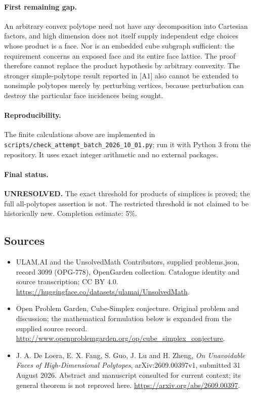 \documentclass[11pt,a4paper]{article}
\begin{document}
\paragraph{First remaining gap.}
An arbitrary convex polytope need not have any decomposition into Cartesian
factors, and high dimension does not itself supply independent edge choices
whose product is a face. Nor is an embedded cube subgraph sufficient: the
requirement concerns an exposed face and its entire face lattice. The proof
therefore cannot replace the product hypothesis by arbitrary convexity.
The stronger simple-polytope result reported in [A1] also cannot be extended
to nonsimple polytopes merely by perturbing vertices, because perturbation
can destroy the particular face incidences being sought.

\paragraph{Reproducibility.}
The finite calculations above are implemented in
\texttt{scripts/check\_attempt\_batch\_2026\_10\_01.py}; run it with Python 3
from the repository. It uses exact integer arithmetic and no external packages.

\paragraph{Final status.}
\textbf{UNRESOLVED.} The exact threshold for products of simplices is proved;
the full all-polytopes assertion is not. The restricted threshold is not
claimed to be historically new. Completion estimate: 5\%.

\subsection{Sources}
\begin{itemize}
\item[S1] ULAM.AI and the UnsolvedMath Contributors, supplied problems.json, record 3099 (OPG-778), OpenGarden collection. Catalogue identity and source transcription; CC BY 4.0.
\url{https://huggingface.co/datasets/ulamai/UnsolvedMath}.
\item[S2] Open Problem Garden, Cube-Simplex conjecture. Original problem and discussion; the mathematical formulation below is expanded from the supplied source record.
\url{http://www.openproblemgarden.org/op/cube_simplex_conjecture}.
\item[A1] J. A. De Loera, E. X. Fang, S. Guo, J. Lu and H. Zheng, \emph{On Unavoidable Faces of High-Dimensional Polytopes}, arXiv:2609.00397v1, submitted 31 August 2026. Abstract and manuscript consulted for current context; its general theorem is not reproved here. \url{https://arxiv.org/abs/2609.00397}.
\end{itemize}
\end{document}

